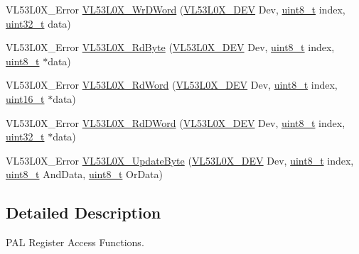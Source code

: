 \begin{DoxyCompactItemize}
\item 
V\+L53\+L0\+X\+\_\+\+Error \hyperlink{group__VL53L0X__registerAccess__group_ga0a117141cf0e6b0a4b97935a367482d5}{V\+L53\+L0\+X\+\_\+\+Wr\+D\+Word} (\hyperlink{group__VL53L0X__platform__group_ga2d6405308b1dd524b462f1b8fb97d167}{V\+L53\+L0\+X\+\_\+\+D\+EV} Dev, \hyperlink{vl53l0x__types_8h_aba7bc1797add20fe3efdf37ced1182c5}{uint8\+\_\+t} index, \hyperlink{vl53l0x__types_8h_a435d1572bf3f880d55459d9805097f62}{uint32\+\_\+t} data)
\item 
V\+L53\+L0\+X\+\_\+\+Error \hyperlink{group__VL53L0X__registerAccess__group_gaab280eabdced8065bc4fb99e221e12f9}{V\+L53\+L0\+X\+\_\+\+Rd\+Byte} (\hyperlink{group__VL53L0X__platform__group_ga2d6405308b1dd524b462f1b8fb97d167}{V\+L53\+L0\+X\+\_\+\+D\+EV} Dev, \hyperlink{vl53l0x__types_8h_aba7bc1797add20fe3efdf37ced1182c5}{uint8\+\_\+t} index, \hyperlink{vl53l0x__types_8h_aba7bc1797add20fe3efdf37ced1182c5}{uint8\+\_\+t} $\ast$data)
\item 
V\+L53\+L0\+X\+\_\+\+Error \hyperlink{group__VL53L0X__registerAccess__group_gabff46b6c5c984c2b6b11783f1c640558}{V\+L53\+L0\+X\+\_\+\+Rd\+Word} (\hyperlink{group__VL53L0X__platform__group_ga2d6405308b1dd524b462f1b8fb97d167}{V\+L53\+L0\+X\+\_\+\+D\+EV} Dev, \hyperlink{vl53l0x__types_8h_aba7bc1797add20fe3efdf37ced1182c5}{uint8\+\_\+t} index, \hyperlink{vl53l0x__types_8h_a273cf69d639a59973b6019625df33e30}{uint16\+\_\+t} $\ast$data)
\item 
V\+L53\+L0\+X\+\_\+\+Error \hyperlink{group__VL53L0X__registerAccess__group_ga18d1e6fe40708046d611d581f20d735b}{V\+L53\+L0\+X\+\_\+\+Rd\+D\+Word} (\hyperlink{group__VL53L0X__platform__group_ga2d6405308b1dd524b462f1b8fb97d167}{V\+L53\+L0\+X\+\_\+\+D\+EV} Dev, \hyperlink{vl53l0x__types_8h_aba7bc1797add20fe3efdf37ced1182c5}{uint8\+\_\+t} index, \hyperlink{vl53l0x__types_8h_a435d1572bf3f880d55459d9805097f62}{uint32\+\_\+t} $\ast$data)
\item 
V\+L53\+L0\+X\+\_\+\+Error \hyperlink{group__VL53L0X__registerAccess__group_gaf8c163567d7906d16cad171957bf4198}{V\+L53\+L0\+X\+\_\+\+Update\+Byte} (\hyperlink{group__VL53L0X__platform__group_ga2d6405308b1dd524b462f1b8fb97d167}{V\+L53\+L0\+X\+\_\+\+D\+EV} Dev, \hyperlink{vl53l0x__types_8h_aba7bc1797add20fe3efdf37ced1182c5}{uint8\+\_\+t} index, \hyperlink{vl53l0x__types_8h_aba7bc1797add20fe3efdf37ced1182c5}{uint8\+\_\+t} And\+Data, \hyperlink{vl53l0x__types_8h_aba7bc1797add20fe3efdf37ced1182c5}{uint8\+\_\+t} Or\+Data)
\end{DoxyCompactItemize}


\subsection{Detailed Description}
P\+AL Register Access Functions. 



